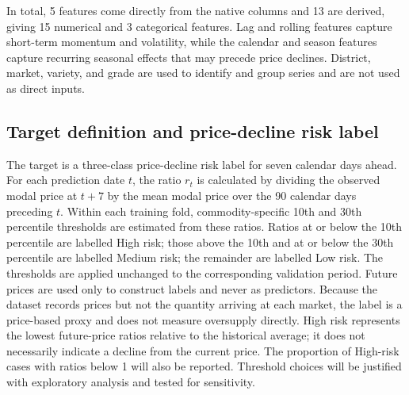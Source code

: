 \documentclass[12pt,a4paper]{article}
\begin{document}
In total, 5 features come directly from the native columns and 13 are derived, giving 15 numerical and 3 categorical features. Lag and rolling features capture short-term momentum and volatility, while the calendar and season features capture recurring seasonal effects that may precede price declines. District, market, variety, and grade are used to identify and group series and are not used as direct inputs.

\subsection{Target definition and price-decline risk label}
The target is a three-class price-decline risk label for seven calendar days ahead. For each prediction date $t$, the ratio $r_t$ is calculated by dividing the observed modal price at $t+7$ by the mean modal price over the 90 calendar days preceding $t$. Within each training fold, commodity-specific 10th and 30th percentile thresholds are estimated from these ratios. Ratios at or below the 10th percentile are labelled High risk; those above the 10th and at or below the 30th percentile are labelled Medium risk; the remainder are labelled Low risk. The thresholds are applied unchanged to the corresponding validation period. Future prices are used only to construct labels and never as predictors. Because the dataset records prices but not the quantity arriving at each market, the label is a price-based proxy and does not measure oversupply directly. High risk represents the lowest future-price ratios relative to the historical average; it does not necessarily indicate a decline from the current price. The proportion of High-risk cases with ratios below 1 will also be reported. Threshold choices will be justified with exploratory analysis and tested for sensitivity.
\end{document}
